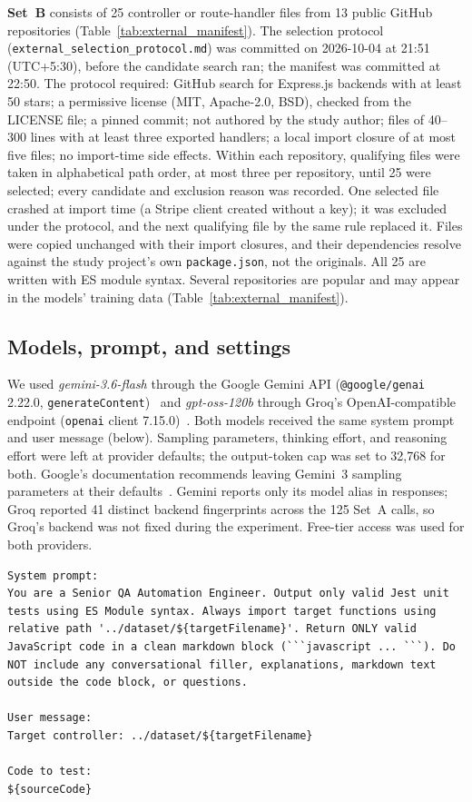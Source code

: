 \documentclass[11pt]{article}
\begin{document}
\textbf{Set~B} consists of 25 controller or route-handler files from 13 public GitHub repositories (Table~\ref{tab:external_manifest}). The selection protocol (\texttt{external\_selection\_protocol.md}) was committed on 2026-10-04 at 21:51 (UTC+5:30), before the candidate search ran; the manifest was committed at 22:50. The protocol required: GitHub search for Express.js backends with at least 50 stars; a permissive license (MIT, Apache-2.0, BSD), checked from the LICENSE file; a pinned commit; not authored by the study author; files of 40--300 lines with at least three exported handlers; a local import closure of at most five files; no import-time side effects. Within each repository, qualifying files were taken in alphabetical path order, at most three per repository, until 25 were selected; every candidate and exclusion reason was recorded. One selected file crashed at import time (a Stripe client created without a key); it was excluded under the protocol, and the next qualifying file by the same rule replaced it. Files were copied unchanged with their import closures, and their dependencies resolve against the study project's own \texttt{package.json}, not the originals. All 25 are written with ES module syntax. Several repositories are popular and may appear in the models' training data (Table~\ref{tab:external_manifest}).

\subsection{Models, prompt, and settings}
We used \textit{gemini-3.6-flash} through the Google Gemini API (\texttt{@google/genai} 2.22.0, \texttt{generateContent})~\cite{google2026gemini36} and \textit{gpt-oss-120b} through Groq's OpenAI-compatible endpoint (\texttt{openai} client 7.15.0)~\cite{openai2025gptoss}. Both models received the same system prompt and user message (below). Sampling parameters, thinking effort, and reasoning effort were left at provider defaults; the output-token cap was set to 32{,}768 for both. Google's documentation recommends leaving Gemini~3 sampling parameters at their defaults~\cite{google2026gemini36}. Gemini reports only its model alias in responses; Groq reported 41 distinct backend fingerprints across the 125 Set~A calls, so Groq's backend was not fixed during the experiment. Free-tier access was used for both providers.

\begin{lstlisting}
System prompt:
You are a Senior QA Automation Engineer. Output only valid Jest unit tests using ES Module syntax. Always import target functions using relative path '../dataset/${targetFilename}'. Return ONLY valid JavaScript code in a clean markdown block (```javascript ... ```). Do NOT include any conversational filler, explanations, markdown text outside the code block, or questions.

User message:
Target controller: ../dataset/${targetFilename}

Code to test:
${sourceCode}
\end{lstlisting}
\end{document}
